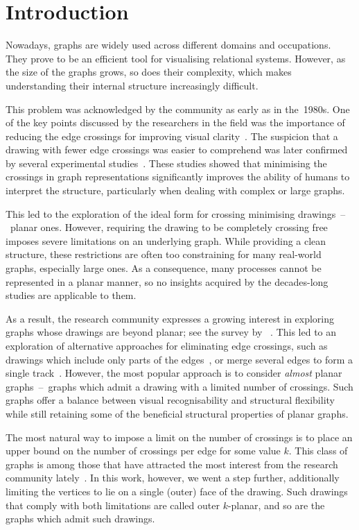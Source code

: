 \chapter{Introduction}\label{ch:introduction}

Nowadays, graphs are widely used across different domains and occupations. They prove to be an efficient tool for visualising relational systems. However, as the size of the graphs grows, so does their complexity, which makes understanding their internal structure increasingly difficult.

This problem was acknowledged by the community as early as in the~1980s. One of the key points discussed by the researchers in the field was the importance of reducing the edge crossings for improving visual clarity~\cite{early-few-crossing}. The suspicion that a drawing with fewer edge crossings was easier to comprehend was later confirmed by several experimental studies~\cite{graph-aesthetic-survey}. These studies showed that minimising the crossings in graph representations significantly improves the ability of humans to interpret the structure, particularly when dealing with complex or large graphs.

This led to the exploration of the ideal form for crossing minimising drawings~--~planar ones. However, requiring the drawing to be completely crossing free imposes severe limitations on an underlying graph. While providing a clean structure, these restrictions are often too constraining for many real-world graphs, especially large ones. As a consequence, many processes cannot be represented in a planar manner, so no insights acquired by the decades-long studies are applicable to them.

As a result, the research community expresses a growing interest in exploring graphs whose drawings are beyond planar; see the survey by \citeauthor{beyond-planarity-survey}~\cite{beyond-planarity-survey}. This led to an exploration of alternative approaches for eliminating edge crossings, such as drawings which include only parts of the edges~\cite{break-the-edge,break-the-edge2}, or merge several edges to form a single track~\cite{confluent-drawings}. However, the most popular approach is to consider \emph{almost} planar graphs~--~graphs which admit a drawing with a limited number of crossings. Such graphs offer a balance between visual recognisability and structural flexibility while still retaining some of the beneficial structural properties of planar graphs.

The most natural way to impose a limit on the number of crossings is to place an upper bound on the number of crossings per edge for some value \(k\). This class of graphs is among those that have attracted the most interest from the research community lately~\cite{contest}. In this work, however, we went a step further, additionally limiting the vertices to lie on a single (outer) face of the drawing. Such drawings that comply with both limitations are called outer \(k\)-planar, and so are the graphs which admit such drawings.


